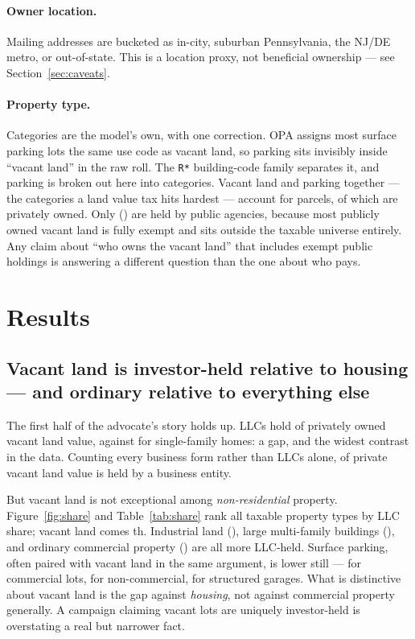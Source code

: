 \documentclass[11pt]{article}
\begin{document}
\paragraph{Owner location.} Mailing addresses are bucketed as in-city, suburban
Pennsylvania, the NJ/DE metro, or out-of-state. This is a location proxy, not beneficial
ownership --- see Section~\ref{sec:caveats}.

\paragraph{Property type.} Categories are the model's own, with one correction. OPA assigns
most surface parking lots the same use code as vacant land, so parking sits invisibly inside
``vacant land'' in the raw roll. The \texttt{R*} building-code family separates it, and
parking is broken out here into \PhilOwnParkingCategories{} categories. Vacant land and
parking together --- the categories a land value tax hits hardest --- account for
\PhilOwnVpParcels{} parcels, of which \PhilOwnVpPrivateParcels{} are privately owned. Only
\PhilOwnVpPublicParcels{} (\PhilOwnVpPublicShare{}) are held by public agencies, because most
publicly owned vacant land is fully exempt and sits outside the taxable universe entirely.
Any claim about ``who owns the vacant land'' that includes exempt public holdings is
answering a different question than the one about who pays.

\section{Results}

\subsection{Vacant land is investor-held relative to housing --- and ordinary relative to
everything else}

The first half of the advocate's story holds up. LLCs hold \PhilOwnVacantLlcShare{} of
privately owned vacant land value, against \PhilOwnSfrLlcShare{} for single-family homes: a
\PhilOwnVacantVsSfrRatio{} gap, and the widest contrast in the data. Counting every business
form rather than LLCs alone, \PhilOwnVacantBusinessShare{} of private vacant land value is
held by a business entity.

But vacant land is not exceptional among \emph{non-residential} property. Figure~\ref{fig:share}
and Table~\ref{tab:share} rank all \PhilOwnTaxableCategories{} taxable property types by LLC
share; vacant land comes \PhilOwnVacantLlcRank{}th. Industrial land
(\PhilOwnIndustrialLlcShare{}), large multi-family buildings (\PhilOwnLargeMfLlcShare{}), and
ordinary commercial property (\PhilOwnCommercialLlcShare{}) are all more LLC-held. Surface
parking, often paired with vacant land in the same argument, is lower still ---
\PhilOwnParkingCommLlcShare{} for commercial lots, \PhilOwnParkingNoncommLlcShare{} for
non-commercial, \PhilOwnGarageLlcShare{} for structured garages. What is distinctive about
vacant land is the gap against \emph{housing}, not against commercial property generally. A
campaign claiming vacant lots are uniquely investor-held is overstating a real but narrower
fact.
\end{document}
